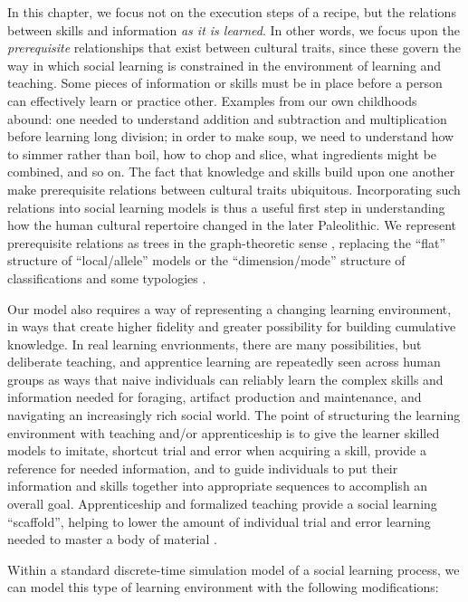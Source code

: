 \documentclass[graybox,natbib]{svmult}
\begin{document}
In this chapter, we focus not on the execution steps of a recipe, but
the relations between skills and information \emph{as it is learned}. In
other words, we focus upon the \emph{prerequisite} relationships that
exist between cultural traits, since these govern the way in which
social learning is constrained in the environment of learning and
teaching. Some pieces of information or skills must be in place before a
person can effectively learn or practice other. Examples from our own
childhoods abound: one needed to understand addition and subtraction and
multiplication before learning long division; in order to make soup, we
need to understand how to simmer rather than boil, how to chop and
slice, what ingredients might be combined, and so on. The fact that
knowledge and skills build upon one another make prerequisite relations
between cultural traits ubiquitous. Incorporating such relations into
social learning models is thus a useful first step in understanding how
the human cultural repertoire changed in the later Paleolithic. We
represent prerequisite relations as trees in the graph-theoretic sense
\citep{diestel2010graph}, replacing the ``flat'' structure of
``local/allele'' models or the ``dimension/mode'' structure of
classifications and some typologies \citep{Dunnell1971}.

Our model also requires a way of representing a changing learning
environment, in ways that create higher fidelity and greater possibility
for building cumulative knowledge. In real learning envrionments, there
are many possibilities, but deliberate teaching, and apprentice learning
are repeatedly seen across human groups as ways that naive individuals
can reliably learn the complex skills and information needed for
foraging, artifact production and maintenance, and navigating an
increasingly rich social world. The point of structuring the learning
environment with teaching and/or apprenticeship is to give the learner
skilled models to imitate, shortcut trial and error when acquiring a
skill, provide a reference for needed information, and to guide
individuals to put their information and skills together into
appropriate sequences to accomplish an overall goal. Apprenticeship and
formalized teaching provide a social learning ``scaffold'', helping to
lower the amount of individual trial and error learning needed to master
a body of material \citep{wimsatt2007reproducing, wimsatt2007re}.

Within a standard discrete-time simulation model of a social learning
process, we can model this type of learning environment with the
following modifications:
\end{document}
